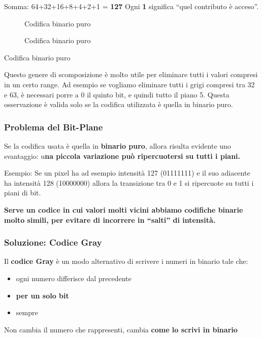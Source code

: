 \documentclass[
]{article}
\providecommand{\tightlist}{%
  \setlength{\itemsep}{0pt}\setlength{\parskip}{0pt}}
\begin{document}
Somma: 64+32+16+8+4+2+1 = \textbf{127}
Ogni \textbf{1} significa ``quel contributo è acceso''.

\begin{figure}
\centering
{Codifica binario puro}
\caption{Codifica binario puro}
\end{figure}

Codifica binario puro

Questo genere di scomposizione è molto utile per eliminare tutti i valori compresi in un certo range.
Ad esempio se vogliamo eliminare tutti i grigi compresi tra 32 e 63, è necessari porre a 0 il quinto bit, e quindi tutto il piano 5.
Questa osservazione è valida solo se la codifica utilizzata è quella in binario puro.

\hypertarget{problema-del-bit-plane}{%
\subsubsection{Problema del Bit-Plane}\label{problema-del-bit-plane}}

Se la codifica usata è quella in \textbf{binario puro}, allora risulta evidente uno svantaggio: u\textbf{na piccola variazione può ripercuotersi su tutti i piani.}

Esempio: Se un pixel ha ad esempio intensità 127 (01111111) e il suo adiacente ha intensità 128 (10000000) allora la transizione tra 0 e 1 si ripercuote su tutti i piani di bit.

\textbf{Serve un codice in cui valori molti vicini abbiamo codifiche binarie molto simili, per evitare di incorrere in ``salti'' di intensità.}

\hypertarget{soluzione-codice-gray}{%
\subsubsection{Soluzione: Codice Gray}\label{soluzione-codice-gray}}

Il \textbf{codice Gray} è un modo alternativo di scrivere i numeri in binario tale che:

\begin{itemize}
\tightlist
\item
  ogni numero differisce dal precedente
\item
  \textbf{per un solo bit}
\item
  sempre
\end{itemize}

Non cambia il numero che rappresenti, cambia \textbf{come lo scrivi in binario}
\end{document}
